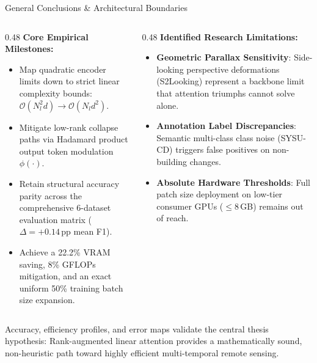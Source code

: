 \documentclass[aspectratio=169]{beamer}
\begin{document}
\begin{frame}{General Conclusions \& Architectural Boundaries}

\begin{columns}[T]
\begin{column}{0.48\textwidth}
\textbf{\color{utecblue}Core Empirical Milestones:}
\vskip 0.15cm
\begin{itemize}
  \item Map quadratic encoder limits down to strict linear complexity bounds: $\mathcal{O}(N_l^2d) \to \mathcal{O}(N_ld^2)$.
  \item Mitigate low-rank collapse paths via Hadamard product output token modulation $\phi(\cdot)$.
  \item Retain structural accuracy parity across the comprehensive 6-dataset evaluation matrix ($\Delta = +0.14$\,pp mean F1).
  \item Achieve a 22.2\% VRAM saving, 8\% GFLOPs mitigation, and an exact uniform 50\% training batch size expansion.
\end{itemize}
\end{column}

\begin{column}{0.48\textwidth}
\textbf{\color{red!80!black}Identified Research Limitations:}
\vskip 0.15cm
\begin{itemize}
  \item \textbf{Geometric Parallax Sensitivity}: Side-looking perspective deformations (S2Looking) represent a backbone limit that attention triumphs cannot solve alone.
  \item \textbf{Annotation Label Discrepancies}: Semantic multi-class class noise (SYSU-CD) triggers false positives on non-building changes.
  \item \textbf{Absolute Hardware Thresholds}: Full patch size deployment on low-tier consumer GPUs ($\leq 8$\,GB) remains out of reach.
\end{itemize}
\end{column}
\end{columns}

\vskip 0.35cm
\centering
\footnotesize\color{charcoal}
Accuracy, efficiency profiles, and error maps validate the central thesis hypothesis: Rank-augmented linear attention provides a mathematically sound, non-heuristic path toward highly efficient multi-temporal remote sensing.

\end{frame}
\end{document}
